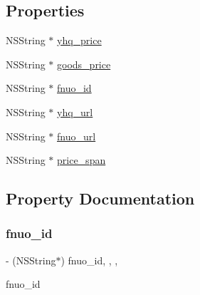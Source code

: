 \subsection*{Properties}
\begin{DoxyCompactItemize}
\item 
N\+S\+String $\ast$ \mbox{\hyperlink{interface_f_n_m_c_top_goods_model_a5ec7f34e7bad67e2ce330b1a6fa8023d}{yhq\+\_\+price}}
\item 
N\+S\+String $\ast$ \mbox{\hyperlink{interface_f_n_m_c_top_goods_model_a2420a9055f6662610db273b8dcf69021}{goods\+\_\+price}}
\item 
N\+S\+String $\ast$ \mbox{\hyperlink{interface_f_n_m_c_top_goods_model_a1e58aaee5ea334c1a6e0c882f7a5071a}{fnuo\+\_\+id}}
\item 
N\+S\+String $\ast$ \mbox{\hyperlink{interface_f_n_m_c_top_goods_model_a0d909365f25e39dd4d8f9ad0ea858751}{yhq\+\_\+url}}
\item 
N\+S\+String $\ast$ \mbox{\hyperlink{interface_f_n_m_c_top_goods_model_a37efcc3fd9207703054ee43b564bd2e7}{fnuo\+\_\+url}}
\item 
N\+S\+String $\ast$ \mbox{\hyperlink{interface_f_n_m_c_top_goods_model_a28fe1a87289d691b8d1984d721e1abbe}{price\+\_\+span}}
\end{DoxyCompactItemize}


\subsection{Property Documentation}
\mbox{\label{interface_f_n_m_c_top_goods_model_a1e58aaee5ea334c1a6e0c882f7a5071a}} 
\subsubsection{\texorpdfstring{fnuo\+\_\+id}{fnuo\_id}}
{\footnotesize\ttfamily -\/ (N\+S\+String$\ast$) fnuo\+\_\+id\hspace{0.3cm}{\ttfamily [read]}, {\ttfamily [write]}, {\ttfamily [nonatomic]}, {\ttfamily [copy]}}

fnuo\+\_\+id \mbox{\label{interface_f_n_m_c_top_goods_model_a37efcc3fd9207703054ee43b564bd2e7}} 
